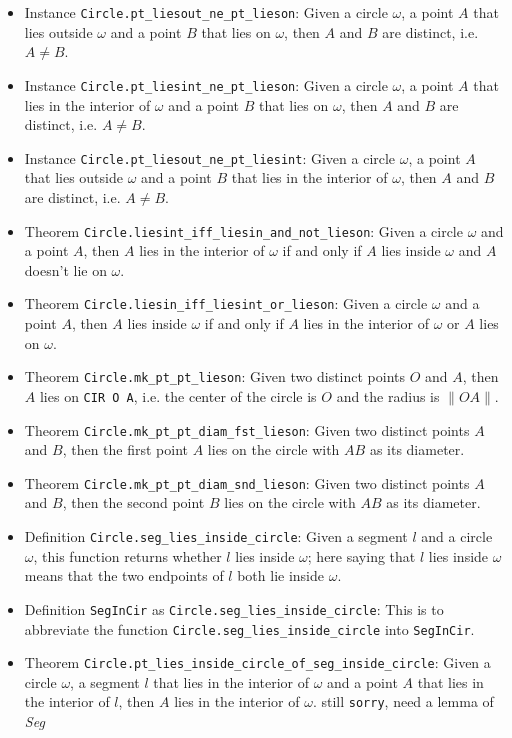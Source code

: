 \documentclass[12pt]{amsart}
\begin{document}
\begin{itemize}
    \item Instance \verb|Circle.pt_liesout_ne_pt_lieson|: Given a circle $\omega$, a point $A$ that lies outside $\omega$ and a point $B$ that lies on $\omega$, then $A$ and $B$ are distinct, i.e. $A \ne B$.
    \item Instance \verb|Circle.pt_liesint_ne_pt_lieson|: Given a circle $\omega$, a point $A$ that lies in the interior of $\omega$ and a point $B$ that lies on $\omega$, then $A$ and $B$ are distinct, i.e. $A \ne B$.
    \item Instance \verb|Circle.pt_liesout_ne_pt_liesint|: Given a circle $\omega$, a point $A$ that lies outside $\omega$ and a point $B$ that lies in the interior of $\omega$, then $A$ and $B$ are distinct, i.e. $A \ne B$.
    \item Theorem \verb|Circle.liesint_iff_liesin_and_not_lieson|: Given a circle $\omega$ and a point $A$, then $A$ lies in the interior of $\omega$ if and only if $A$ lies inside $\omega$ and $A$ doesn't lie on $\omega$.
    \item Theorem \verb|Circle.liesin_iff_liesint_or_lieson|: Given a circle $\omega$ and a point $A$, then $A$ lies inside $\omega$ if and only if $A$ lies in the interior of $\omega$ or $A$ lies on $\omega$.
    \item Theorem \verb|Circle.mk_pt_pt_lieson|: Given two distinct points $O$ and $A$, then $A$ lies on \verb|CIR O A|, i.e. the center of the circle is $O$ and the radius is $\|OA\|$.
    \item Theorem \verb|Circle.mk_pt_pt_diam_fst_lieson|: Given two distinct points $A$ and $B$, then the first point $A$ lies on the circle with $AB$ as its diameter.
    \item Theorem \verb|Circle.mk_pt_pt_diam_snd_lieson|: Given two distinct points $A$ and $B$, then the second point $B$ lies on the circle with $AB$ as its diameter.
    \item Definition \verb|Circle.seg_lies_inside_circle|: Given a segment $l$ and a circle $\omega$, this function returns whether $l$ lies inside $\omega$; here saying that $l$ lies inside $\omega$ means that the two endpoints of $l$ both lie inside $\omega$.
    \item Definition \verb|SegInCir| as \verb|Circle.seg_lies_inside_circle|: This is to abbreviate the function \verb|Circle.seg_lies_inside_circle| into \verb|SegInCir|.
    \item Theorem \verb|Circle.pt_lies_inside_circle_of_seg_inside_circle|: Given a circle $\omega$, a segment $l$ that lies in the interior of $\omega$ and a point $A$ that lies in the interior of $l$, then $A$ lies in the interior of $\omega$. {\color{red} still \verb|sorry|, need a lemma of \emph{Seg}}
\end{itemize}
\end{document}
